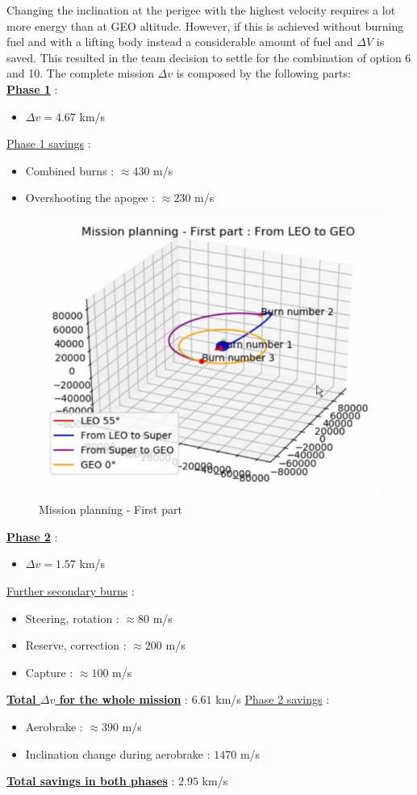 Changing the inclination at the perigee with the highest velocity requires a lot more energy than at GEO
altitude. However, if this is achieved without burning fuel and with a lifting body instead a considerable amount of fuel and $\Delta V$ is saved. This resulted in the team decision to settle for the combination of option 6 and 10. The complete mission $\Delta v$ is composed by the following parts:\\
\textbf{\underline{Phase 1}} :
\begin{itemize}
	\item $\Delta v = 4.67$ km/s
\end{itemize}
{\underline{Phase 1 savings}} :
\begin{itemize}
	\item Combined burns : $\approx 430$ m/s
	\item Overshooting the apogee : $\approx 230$ m/s
\end{itemize}
\begin{figure}[H]
	\centering\includegraphics[width=0.6\linewidth]{mission1}
	\caption{Mission planning - First part}
\end{figure}
\textbf{\underline{Phase 2}} :
\begin{itemize}
	\item $\Delta v = 1.57$ km/s
\end{itemize}
{\underline{Further secondary burns}} :
\begin{itemize}
	\item Steering, rotation : $\approx 80$ m/s
	\item Reserve, correction : $\approx 200$ m/s
	\item Capture : $\approx 100$ m/s
\end{itemize}
\underline{\textbf{Total $\Delta v$ for the whole mission}} : $6.61$ km/s
{\underline{Phase 2 savings}} :
\begin{itemize}
	\item Aerobrake : $\approx 390$ m/s
	\item Inclination change during aerobrake : $1470$ m/s
\end{itemize}
\underline{\textbf{Total savings in both phases}} : $2.95$ km/s\\

